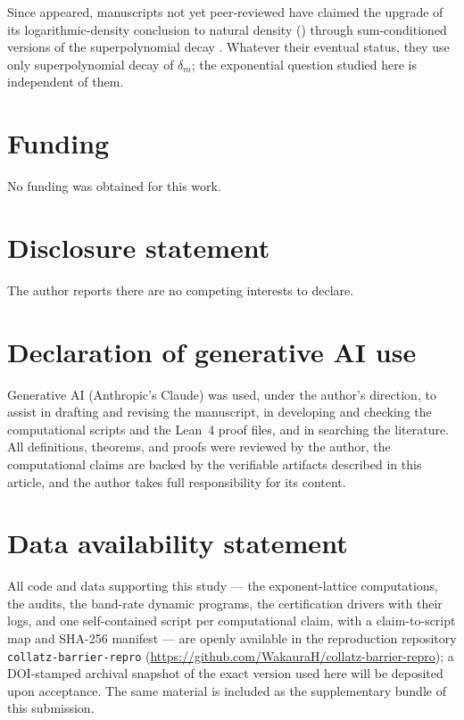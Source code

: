 \documentclass[11pt]{article}
\theoremstyle{definition}
\begin{document}
Since \cite{Tao2022} appeared, manuscripts not yet peer-reviewed have claimed the
upgrade of its logarithmic-density conclusion to natural density
(\cite[Remark~1.16]{Tao2022}) through sum-conditioned versions of the
superpolynomial decay \cite{Allikvere2026}. Whatever their eventual
status, they use only superpolynomial decay of $\delta_m$; the
exponential question studied here is independent of them.

\section*{Funding}

No funding was obtained for this work.

\section*{Disclosure statement}

The author reports there are no competing interests to declare.

\section*{Declaration of generative AI use}

Generative AI (Anthropic's Claude) was used, under the author's direction,
to assist in drafting and revising the manuscript, in developing and
checking the computational scripts and the Lean~4 proof files, and in
searching the literature. All definitions, theorems, and proofs were
reviewed by the author, the computational claims are backed by the
verifiable artifacts described in this article, and the author takes full
responsibility for its content.

\section*{Data availability statement}
All code and data supporting this study --- the exponent-lattice
computations, the audits, the band-rate dynamic programs, the
certification drivers with their logs, and one self-contained script per
computational claim, with a claim-to-script map and SHA-256 manifest ---
are openly available in the reproduction repository
\texttt{collatz-barrier-repro}
(\url{https://github.com/WakauraH/collatz-barrier-repro}); a
DOI-stamped archival snapshot of the exact version used here will be
deposited upon acceptance. The same material is included as the
supplementary bundle of this submission.
\end{document}
